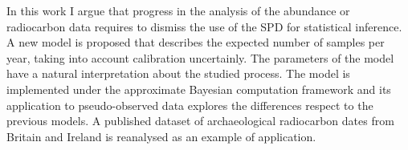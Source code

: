 \documentclass[a4paper]{article}
\begin{document}
In this work I argue that progress in the analysis of the abundance or radiocarbon data requires to dismiss the use of the SPD for statistical inference. A new model is proposed that describes the expected number of samples per year, taking into account calibration uncertainly. The parameters of the model have a natural interpretation about the studied process. The model is implemented under the approximate Bayesian computation framework and its application to pseudo-observed data explores the differences respect to the previous models. A published dataset of archaeological radiocarbon dates from Britain and Ireland \parencite{Bevan2017b} is reanalysed as an example of application.
\\





\end{document}
